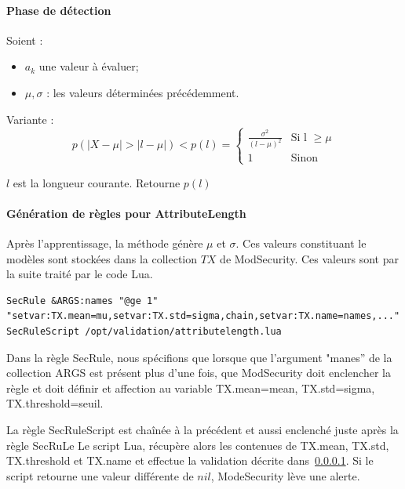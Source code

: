 \documentclass[a4paper,10pt,justified,openany]{tufte-book}
\begin{document}
 \paragraph{Phase de détection}
 \label{detectional}
  Soient : 
  \begin{itemize}
  \item $a_k$ une valeur à évaluer;
   \item $\mu, \sigma$ : les valeurs déterminées précédemment. 
  \end{itemize}
   
 
 Variante :  
 \begin{equation}
  p(|X - \mu| > |l - \mu|) < p(l) = \left\lbrace \begin{array}{ll}
                                            \frac{\sigma^2}{(l-\mu)^2} & \textrm{Si l $\ge \mu$}  \\
                                            1 & \textrm{Sinon}
                                           \end{array}\right.
 \end{equation}

 $l$ est la longueur courante. Retourne $p(l)$

\paragraph{\textbf{Génération de règles pour AttributeLength}}
 
 Après l'apprentissage, la méthode génère $\mu$ et $\sigma$. Ces valeurs constituant le modèles sont stockées dans la collection $TX$ de ModSecurity.
 Ces valeurs sont par la suite traité par le code Lua.
 
\begin{verbatim}
SecRule &ARGS:names "@ge 1" "setvar:TX.mean=mu,setvar:TX.std=sigma,chain,setvar:TX.name=names,..." 
SecRuleScript /opt/validation/attributelength.lua
 \end{verbatim}

Dans la règle SecRule, nous spécifions que lorsque que l'argument "manes'' de la collection ARGS est présent plus d'une fois, que ModSecurity doit enclencher la règle
et doit définir et affection au variable TX.mean=mean, TX.std=sigma, TX.threshold=seuil.

La règle SecRuleScript est chaînée à la précédent et aussi enclenché juste après la règle SecRuLe
Le script Lua, récupère alors les contenues de TX.mean, TX.std, TX.threshold et TX.name et effectue la validation décrite dans~\ref{detectional}. 
Si le script retourne une valeur différente de $nil$, ModeSecurity lève une alerte. 
 
\end{document}

